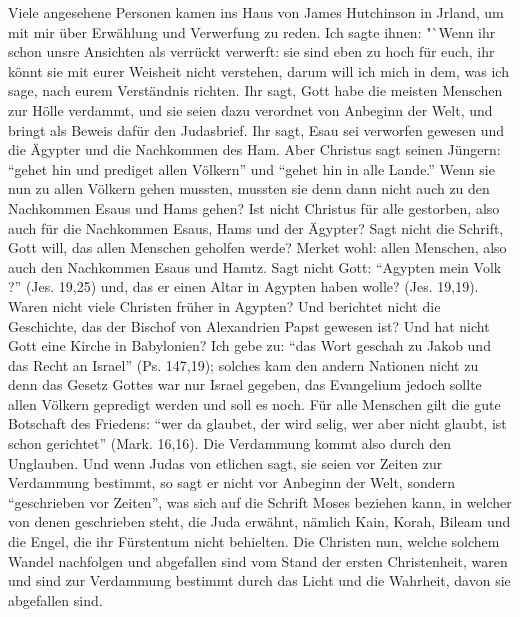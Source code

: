 Viele angesehene Personen kamen ins Haus von James 
Hutchinson in Jrland, um 
mit mir über Erwählung und Verwerfung zu
reden. Ich sagte ihnen: "`Wenn ihr schon unsre Ansichten als
verrückt verwerft: sie sind eben zu hoch für euch, ihr könnt sie
mit eurer Weisheit nicht verstehen, darum will ich mich in dem,
was ich sage, nach eurem Verständnis richten. Ihr sagt, Gott
habe die meisten Menschen zur Hölle verdammt, und sie seien
dazu verordnet von Anbeginn der Welt, und bringt als Beweis
dafür den Judasbrief. Ihr sagt, 
Esau sei verworfen gewesen
und die Ägypter und die Nachkommen des Ham. Aber Christus
sagt seinen Jüngern: "`gehet hin und prediget allen Völkern"' und
"`gehet hin in alle Lande."' Wenn sie nun zu allen Völkern gehen
mussten, mussten sie denn dann nicht auch zu den Nachkommen
Esaus und Hams gehen? Ist nicht Christus für alle gestorben,
also auch für die Nachkommen Esaus, Hams und der Ägypter?
Sagt nicht die Schrift, Gott will, das allen Menschen geholfen werde?
Merket wohl: allen Menschen, also auch den Nachkommen Esaus
und Hamtz. Sagt nicht Gott: "`Agypten mein Volk ?"' 
(Jes. 19,25)
und, das er einen Altar in Agypten haben wolle? 
(Jes. 19,19).
Waren nicht viele Christen früher in Agypten? Und berichtet
nicht die Geschichte, das der Bischof von Alexandrien Papst 
gewesen ist? Und hat nicht Gott eine Kirche in Babylonien? Ich
gebe zu: "`das Wort geschah zu Jakob und das Recht an Israel"'
(Ps. 147,19); solches kam den andern Nationen nicht zu
denn das Gesetz Gottes war nur Israel gegeben, das Evangelium
jedoch sollte allen Völkern gepredigt werden und soll es noch.
Für alle Menschen gilt die gute Botschaft des Friedens: "`wer
da glaubet, der wird selig, wer aber nicht glaubt, ist schon
gerichtet"' (Mark. 16,16). 
Die Verdammung kommt also durch
den Unglauben. Und wenn Judas von etlichen sagt, sie seien
vor Zeiten zur Verdammung bestimmt, so sagt er nicht vor 
Anbeginn der Welt, sondern "`geschrieben vor Zeiten"', was sich auf
die Schrift Moses beziehen kann, in welcher von denen geschrieben
steht, die Juda erwähnt, nämlich Kain, Korah, Bileam und die
Engel, die ihr Fürstentum nicht behielten. Die Christen nun,
welche solchem Wandel nachfolgen und abgefallen sind vom Stand
der ersten Christenheit, waren und sind zur Verdammung bestimmt
durch das Licht und die Wahrheit, davon sie abgefallen sind.
